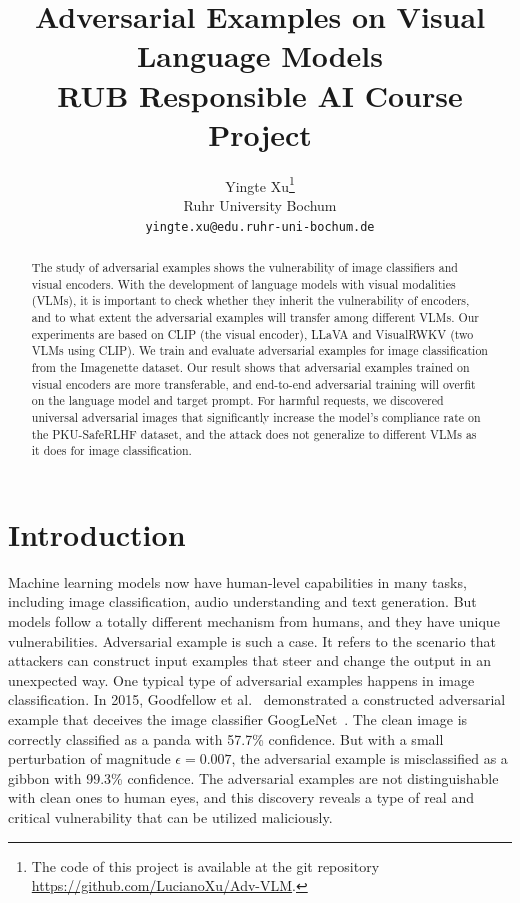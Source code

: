 \documentclass{article}
\title{
  Adversarial Examples on Visual Language Models \\
  \vspace{1em}
  \small{\normalfont RUB Responsible AI Course Project}
}
\author{
  Yingte Xu\thanks{The code of this project is available at the git repository \url{https://github.com/LucianoXu/Adv-VLM}.}\\
  Ruhr University Bochum \\
  \texttt{yingte.xu@edu.ruhr-uni-bochum.de}
}
\begin{document}
\maketitle

\begin{abstract}
The study of adversarial examples shows the vulnerability of image classifiers and visual encoders. 
With the development of language models with visual modalities (VLMs), it is important to check whether they inherit the vulnerability of encoders, and to what extent the adversarial examples will transfer among different VLMs.
Our experiments are based on CLIP (the visual encoder), LLaVA and VisualRWKV (two VLMs using CLIP). We train and evaluate adversarial examples for image classification from the Imagenette dataset.
Our result shows that adversarial examples trained on visual encoders are more transferable, and end-to-end adversarial training will overfit on the language model and target prompt.
For harmful requests, we discovered universal adversarial images that significantly increase the model's compliance rate on the PKU-SafeRLHF dataset, and the attack does not generalize to different VLMs as it does for image classification.
\end{abstract}



\section{Introduction}

Machine learning models now have human-level capabilities in many tasks, including image classification, audio understanding and text generation.
But models follow a totally different mechanism from humans, and they have unique vulnerabilities.
Adversarial example is such a case.
It refers to the scenario that attackers can construct input examples that steer and change the output in an unexpected way.
One typical type of adversarial examples happens in image classification.
In 2015, Goodfellow et al.~\cite{Goodfellow2015FGSM} demonstrated a constructed adversarial example that deceives the image classifier GoogLeNet~\cite{Szegedy2015GoogLeNet}. 
The clean image is correctly classified as a panda with 57.7\% confidence. But with a small perturbation of magnitude $\epsilon = 0.007$, the adversarial example is misclassified as a gibbon with 99.3\% confidence.
The adversarial examples are not distinguishable with clean ones to human eyes, and this discovery reveals a type of real and critical vulnerability that can be utilized maliciously.
\end{document}
